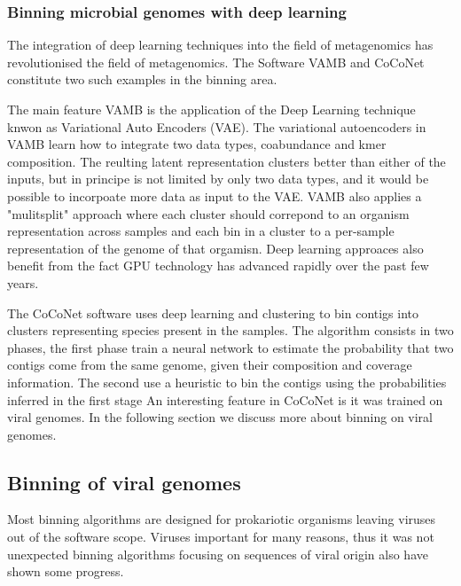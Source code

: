 \documentclass{article}
\begin{document}
\subsubsection{Binning microbial genomes with deep learning}
The integration of deep learning techniques into the field of metagenomics has revolutionised the field of metagenomics. The Software VAMB and CoCoNet constitute two such examples in the binning area.

The main feature VAMB is the application of the Deep Learning technique knwon as Variational Auto Encoders (VAE). The variational autoencoders in VAMB learn how to integrate two data types, coabundance and kmer composition. The reulting latent representation clusters better than either of the inputs, but in principe is not limited by only two data types, and it would be possible to incorpoate more data as input to the VAE.
VAMB also applies a "mulitsplit" approach where each cluster should correpond to an organism representation across samples and each bin in a cluster to a per-sample representation of the genome of that orgamisn.
Deep learning approaces also benefit from the fact GPU technology has advanced rapidly over the past few years.

The CoCoNet software uses deep learning and clustering to bin contigs into clusters representing species present in the samples.
The algorithm consists in two phases, the first phase train a neural network to estimate the probability that two contigs come from the same genome, given their composition and coverage information. The second use a heuristic to bin the contigs using the probabilities inferred in the first stage
An interesting feature in CoCoNet is it was trained on viral genomes. In the following section we discuss more about binning on viral genomes. 

\subsection{Binning of viral genomes}

Most binning algorithms are designed for prokariotic organisms leaving viruses out of the software scope. Viruses important for many reasons, thus it was not unexpected binning algorithms focusing on sequences of viral origin also have shown some progress. 
\end{document}
